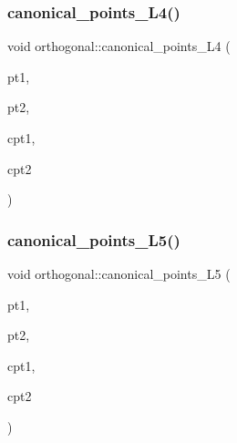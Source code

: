 \subsubsection{\texorpdfstring{canonical\+\_\+points\+\_\+\+L4()}{canonical\_points\_L4()}}
{\footnotesize\ttfamily void orthogonal\+::canonical\+\_\+points\+\_\+\+L4 (\begin{DoxyParamCaption}\item[{\mbox{\hyperlink{galois_8h_a09fddde158a3a20bd2dcadb609de11dc}{I\+NT}}}]{pt1,  }\item[{\mbox{\hyperlink{galois_8h_a09fddde158a3a20bd2dcadb609de11dc}{I\+NT}}}]{pt2,  }\item[{\mbox{\hyperlink{galois_8h_a09fddde158a3a20bd2dcadb609de11dc}{I\+NT}} \&}]{cpt1,  }\item[{\mbox{\hyperlink{galois_8h_a09fddde158a3a20bd2dcadb609de11dc}{I\+NT}} \&}]{cpt2 }\end{DoxyParamCaption})}

\mbox{\label{classorthogonal_a05ef1c374d592c18185ef2c263c20298}} 
\subsubsection{\texorpdfstring{canonical\+\_\+points\+\_\+\+L5()}{canonical\_points\_L5()}}
{\footnotesize\ttfamily void orthogonal\+::canonical\+\_\+points\+\_\+\+L5 (\begin{DoxyParamCaption}\item[{\mbox{\hyperlink{galois_8h_a09fddde158a3a20bd2dcadb609de11dc}{I\+NT}}}]{pt1,  }\item[{\mbox{\hyperlink{galois_8h_a09fddde158a3a20bd2dcadb609de11dc}{I\+NT}}}]{pt2,  }\item[{\mbox{\hyperlink{galois_8h_a09fddde158a3a20bd2dcadb609de11dc}{I\+NT}} \&}]{cpt1,  }\item[{\mbox{\hyperlink{galois_8h_a09fddde158a3a20bd2dcadb609de11dc}{I\+NT}} \&}]{cpt2 }\end{DoxyParamCaption})}

\mbox{\label{classorthogonal_a4b8cedf4e1fa30a7860d12b4cc756ec9}} 
